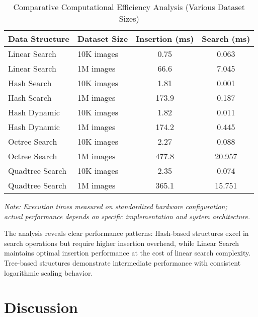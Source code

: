 \documentclass{sbc2023}
\begin{document}
\begin{table}[H]
    \footnotesize 
    \centering
    \caption{Comparative Computational Efficiency Analysis (Various Dataset Sizes)}
    \label{tab:computational_efficiency}
    \setlength{\tabcolsep}{3pt}
    \begin{tabularx}{\columnwidth}{|l|l|c|c|}
        \hline
        \textbf{Data Structure} & \textbf{Dataset Size} & \textbf{Insertion (ms)} & \textbf{Search (ms)} \\ 
        \hline
        Linear Search & 10K images & 0.75 & 0.063 \\
        Linear Search & 1M images & 66.6 & 7.045 \\
        Hash Search & 10K images & 1.81 & 0.001 \\
        Hash Search & 1M images & 173.9 & 0.187 \\
        Hash Dynamic & 10K images & 1.82 & 0.011 \\
        Hash Dynamic & 1M images & 174.2 & 0.445 \\
        Octree Search & 10K images & 2.27 & 0.088 \\
        Octree Search & 1M images & 477.8 & 20.957 \\
        Quadtree Search & 10K images & 2.35 & 0.074 \\
        Quadtree Search & 1M images & 365.1 & 15.751 \\
        \hline
    \end{tabularx}
    \vspace{0.2cm}
    \begin{minipage}{\columnwidth}
    \footnotesize
    \textit{Note: Execution times measured on standardized hardware configuration; \\actual performance depends on specific implementation and system architecture.}
    \end{minipage}
\end{table}

The analysis reveals clear performance patterns: Hash-based structures excel in search operations but require higher insertion overhead, while Linear Search maintains optimal insertion performance at the cost of linear search complexity. Tree-based structures demonstrate intermediate performance with consistent logarithmic scaling behavior.

\section{Discussion}
\label{sec:discussion}
\end{document}
